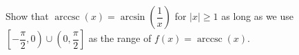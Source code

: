  {Show that $\operatorname{arccsc}(x) = \arcsin \left( \dfrac{1}{x} \right)$ for $|x| \geq 1$ as long as we use $\left[ -\dfrac{\pi}{2}, 0 \right) \cup \left(0, \dfrac{\pi}{2} \right]$ as the range of $f(x) = \operatorname{arccsc}(x)$.}
{}
